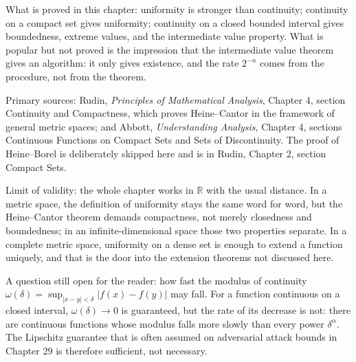 \begin{untukpeneliti}
What is proved in this chapter: uniformity is stronger than continuity; continuity
on a compact set gives uniformity; continuity on a closed bounded interval
gives boundedness, extreme values, and the intermediate value property. What is popular but
not proved is the impression that the intermediate value theorem gives an algorithm: it
only gives existence, and the rate $2^{-n}$ comes from the procedure, not from the
theorem.

Primary sources: Rudin, \emph{Principles of Mathematical Analysis}, Chapter 4, section
Continuity and Compactness, which proves Heine--Cantor in the framework of general metric
spaces; and Abbott, \emph{Understanding Analysis}, Chapter 4, sections Continuous Functions on
Compact Sets and Sets of Discontinuity. The proof of Heine--Borel is deliberately skipped
here and is in Rudin, Chapter 2, section Compact Sets.

Limit of validity: the whole chapter works in $\mathbb{R}$ with the usual distance. In a
metric space, the definition of uniformity stays the same word for word, but the
Heine--Cantor theorem demands compactness, not merely closedness and boundedness; in an
infinite-dimensional space those two properties separate. In a complete metric space,
uniformity on a dense set is enough to extend a function uniquely, and that is the door
into the extension theorems not discussed here.

A question still open for the reader: how fast the modulus of continuity
$\omega(\delta)=\sup_{|x-y|<\delta}|f(x)-f(y)|$ may fall. For a function continuous
on a closed interval, $\omega(\delta)\to 0$ is guaranteed, but the rate of its decrease is
not: there are continuous functions whose modulus falls more slowly than every power
$\delta^{\alpha}$. The Lipschitz guarantee that is often assumed on adversarial attack
bounds in Chapter 29 is therefore sufficient, not necessary.
\end{untukpeneliti}

